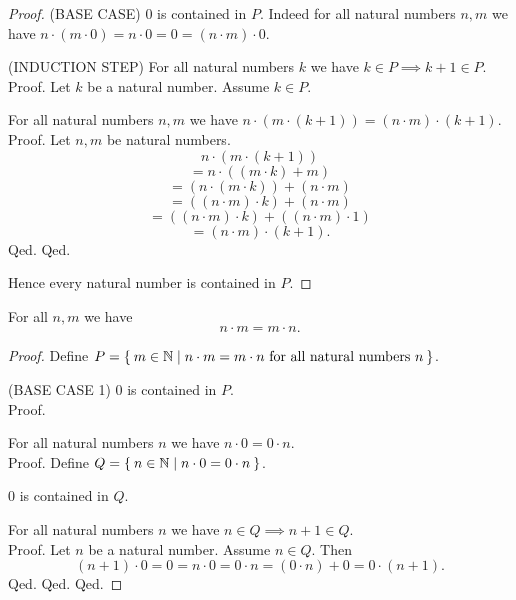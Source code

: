\documentclass[../../natural-numbers.ftl.tex]{subfiles}
\begin{document}
\begin{forthel}
\begin{proof}
      (BASE CASE) $0$ is contained in $P$.
      Indeed for all natural numbers $n,m$ we have $n \cdot (m \cdot 0) = n \cdot 0 = 0 = (n \cdot m) \cdot 0$.

      (INDUCTION STEP) For all natural numbers $k$ we have $k \in P \implies k + 1 \in P$. \\
      Proof.
        Let $k$ be a natural number.
        Assume $k \in P$.

        For all natural numbers $n,m$ we have $n \cdot (m \cdot (k + 1)) = (n \cdot m) \cdot (k + 1)$. \\
        Proof.
          Let $n,m$ be natural numbers.
          \[ n \cdot (m \cdot (k + 1)) \]
          \[ = n \cdot ((m \cdot k) + m) \]
          \[ = (n \cdot (m \cdot k)) + (n \cdot m) \]
          \[ = ((n \cdot m) \cdot k) + (n \cdot m) \]
          \[ = ((n \cdot m) \cdot k) + ((n \cdot m) \cdot 1) \]
          \[ = (n \cdot m) \cdot (k + 1). \]
        Qed.
      Qed.

      Hence every natural number is contained in $P$.
    \end{proof}


    \begin{proposition}\label{Arithmetic_01_03_850937}
      For all $n,m$ we have \[ n \cdot m = m \cdot n. \]
    \end{proposition}
    \begin{proof}
      Define $P = \Set{m \in \mathbb{N} | \text{$n \cdot m = m \cdot n$ for all natural numbers $n$}}$.

      (BASE CASE 1) $0$ is contained in $P$. \\
      Proof.

        For all natural numbers $n$ we have $n \cdot 0 = 0 \cdot n$. \\
        Proof.
          Define $Q = \Set{n \in \mathbb{N} | n \cdot 0 = 0 \cdot n}$.

          $0$ is contained in $Q$.

          For all natural numbers $n$ we have $n \in Q \implies n + 1 \in Q$. \\
          Proof.
            Let $n$ be a natural number.
            Assume $n \in Q$.
            Then
            \[
              (n + 1) \cdot 0
            = 0                 %
            = n \cdot 0         %
            = 0 \cdot n         %
            = (0 \cdot n) + 0   %
            = 0 \cdot (n + 1).  %
            \]
          Qed.
        Qed.
      Qed.


\end{proof}
\end{forthel}
\end{document}
